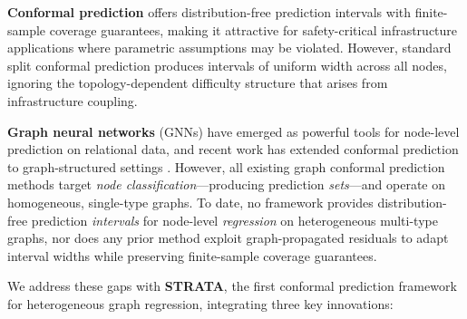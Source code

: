 \documentclass[twoside,11pt]{article}
\begin{document}
\textbf{Conformal prediction} \citep{vovk2005algorithmic,shafer2008tutorial,
angelopoulos2023conformal} offers distribution-free prediction intervals with
finite-sample coverage guarantees, making it attractive for safety-critical
infrastructure applications where parametric assumptions may be violated.
However, standard split conformal prediction produces intervals of uniform
width across all nodes, ignoring the topology-dependent difficulty structure
that arises from infrastructure coupling.

\textbf{Graph neural networks} (GNNs) \citep{kipf2017semi,gilmer2017neural,
hamilton2017inductive} have emerged as powerful tools for node-level prediction
on relational data, and recent work has extended conformal prediction to
graph-structured settings \citep{zargarbashi2023conformal,huang2024uncertainty,
clarkson2023distribution}. However, all existing graph conformal prediction
methods target \emph{node classification}---producing prediction
\emph{sets}---and operate on homogeneous, single-type graphs.
To date, no framework provides distribution-free prediction
\emph{intervals} for node-level \emph{regression} on heterogeneous
multi-type graphs, nor does any prior method exploit graph-propagated
residuals to adapt interval widths while preserving finite-sample coverage
guarantees.

We address these gaps with \textbf{STRATA}, the first conformal prediction
framework for heterogeneous graph regression, integrating
three key innovations:
\end{document}
